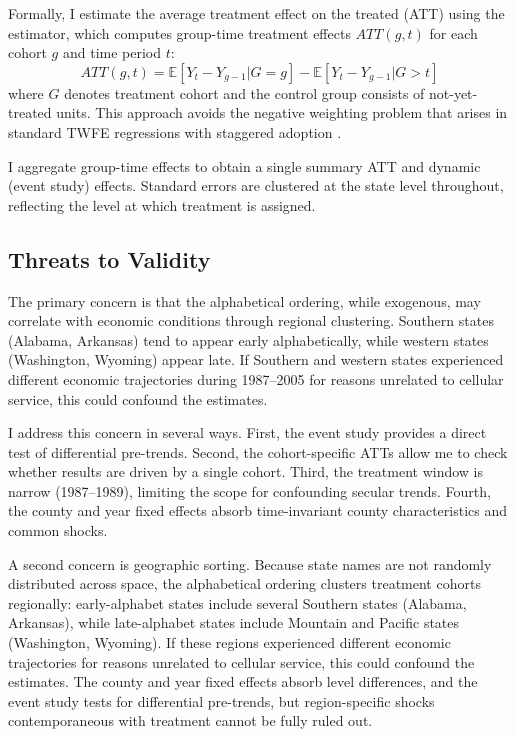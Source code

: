 \documentclass[12pt]{article}
\newcommand{\E}{\mathbb{E}}
\begin{document}
Formally, I estimate the average treatment effect on the treated (ATT) using the \citet{callaway2021} estimator, which computes group-time treatment effects $ATT(g,t)$ for each cohort $g$ and time period $t$:
\begin{equation}
ATT(g,t) = \E[Y_t - Y_{g-1} | G = g] - \E[Y_t - Y_{g-1} | G > t]
\end{equation}
where $G$ denotes treatment cohort and the control group consists of not-yet-treated units. This approach avoids the negative weighting problem that arises in standard TWFE regressions with staggered adoption \citep{goodman2021}.

I aggregate group-time effects to obtain a single summary ATT and dynamic (event study) effects. Standard errors are clustered at the state level throughout, reflecting the level at which treatment is assigned.

\subsection{Threats to Validity}

The primary concern is that the alphabetical ordering, while exogenous, may correlate with economic conditions through regional clustering. Southern states (Alabama, Arkansas) tend to appear early alphabetically, while western states (Washington, Wyoming) appear late. If Southern and western states experienced different economic trajectories during 1987--2005 for reasons unrelated to cellular service, this could confound the estimates.

I address this concern in several ways. First, the event study provides a direct test of differential pre-trends. Second, the cohort-specific ATTs allow me to check whether results are driven by a single cohort. Third, the treatment window is narrow (1987--1989), limiting the scope for confounding secular trends. Fourth, the county and year fixed effects absorb time-invariant county characteristics and common shocks.

A second concern is geographic sorting. Because state names are not randomly distributed across space, the alphabetical ordering clusters treatment cohorts regionally: early-alphabet states include several Southern states (Alabama, Arkansas), while late-alphabet states include Mountain and Pacific states (Washington, Wyoming). If these regions experienced different economic trajectories for reasons unrelated to cellular service, this could confound the estimates. The county and year fixed effects absorb level differences, and the event study tests for differential pre-trends, but region-specific shocks contemporaneous with treatment cannot be fully ruled out.
\end{document}
